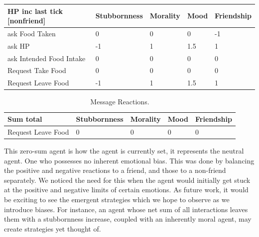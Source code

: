 \begin{table}[htb]
    \centering
    \begin{tabular}{@{}lllll@{}}
    \toprule
    HP inc last tick [nonfriend]    & Stubbornness      & Morality         & Mood             & Friendship     \\ \midrule
    ask Food Taken                  & 0                 & 0                & 0                & -1             \\
    ask HP                          & -1                & 1                & 1.5              & 1              \\
    ask Intended Food Intake        & 0                 & 0                & 0                & 0              \\
    Request Take Food               & 0                 & 0                & 0                & 0              \\
    Request Leave Food              & -1                & 1                & 1.5              & 1              \\ \bottomrule
    \end{tabular}
\end{table}
\begin{table}[htb]
    \centering
    \begin{tabular}{@{}lllll@{}}
    \toprule
    Sum total                       & Stubbornness      & Morality         & Mood             & Friendship     \\ \midrule
    Request Leave Food              & 0                 & 0                & 0                & 0              \\ \bottomrule
    \end{tabular}
    \caption{Message Reactions.}
\end{table}
This zero-sum agent is how the agent is currently set, it represents the neutral agent. One who possesses no inherent emotional bias. This was done by balancing the positive and negative reactions to a friend, and those to a non-friend separately. We noticed the need for this when the agent would initially get stuck at the positive and negative limits of certain emotions. As future work, it would be exciting to see the emergent strategies which we hope to observe as we introduce biases. For instance, an agent whose net sum of all interactions leaves them with a stubbornness increase, coupled with an inherently moral agent, may create strategies yet thought of. 

